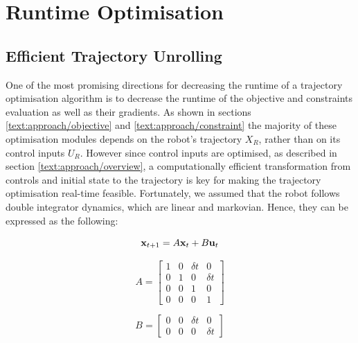 
\section{Runtime Optimisation}
\label{text:approach/runtime}

\subsection{Efficient Trajectory Unrolling}
\label{text:approach/runtime/unrolling}
One of the most promising directions for decreasing the runtime of a trajectory optimisation algorithm is to decrease the runtime of the objective and constraints evaluation as well as their gradients. As shown in sections \ref{text:approach/objective} and \ref{text:approach/constraint} the majority of these optimisation modules depends on the robot's trajectory $X_R$, rather than on its control inputs $U_R$. However since control inputs are optimised, as described in section \ref{text:approach/overview}, a computationally efficient transformation from controls and initial state to the trajectory is key for making the trajectory optimisation real-time feasible.
\newline
Fortunately, we assumed that the robot follows double integrator dynamics, which are linear and markovian. Hence, they can be expressed as the following: 

\begin{equation}
\mathbf{x}_{t+1} = A \mathbf{x}_t + B \mathbf{u}_t
\label{eq:dynamics}
\end{equation}

\begin{minipage}{0.5\textwidth}
$$A = \begin{bmatrix} 1 & 0 & \delta t & 0 \\ 0 & 1 & 0 & \delta t \\ 0 & 0 & 1 & 0 \\ 0 & 0 & 0 & 1\end{bmatrix}$$
\end{minipage}
\begin{minipage}{0.5\textwidth}
$$B = \begin{bmatrix} 0 & 0 & \delta t & 0 \\ 0 & 0 & 0 & \delta t \end{bmatrix}$$
\end{minipage}

